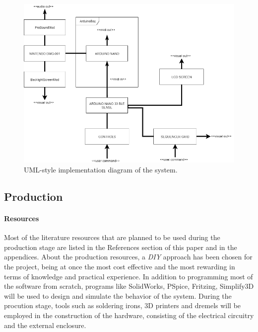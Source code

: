 \documentclass[]{article}
\begin{document}
        \begin{figure}[h]
            \includegraphics[width=\linewidth]{implementation-diagram.png}
                \caption{UML-style implementation diagram of the system.}
                \label{umldiagram}
            \end{figure} 
        
        \subsection{Production}
            \paragraph{Resources}
            Most of the literature resources that are planned to be used during the production stage are listed in the References section of this paper and
            in the appendices. About the production resources, a \emph{DIY} approach has been chosen for the project, being at once the most cost effective 
            and the most rewarding in terms of knowledge and practical experience. In addition to programming most of the software from scratch, programs like SolidWorks,
            PSpice, Fritzing, Simplify3D will be used to design and simulate the behavior of the system. During the procution stage, tools such as 
            soldering irons, 3D printers and dremels will be employed in the construction of the hardware, consisting of the electrical circuitry and the external enclosure.
            
\end{document}
